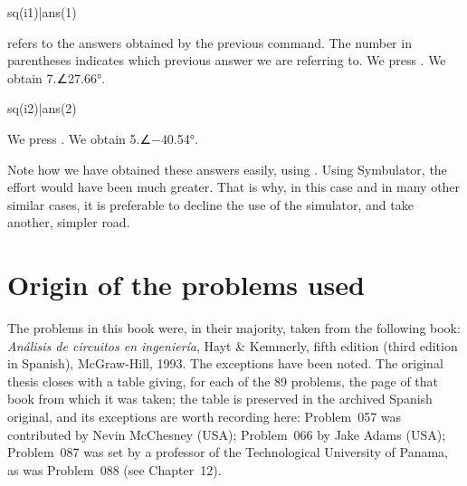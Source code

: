 \begin{entry}
sq\absang(i1)|ans(1)
\end{entry}

 refers to the answers obtained by the previous
command. The number in parentheses indicates which previous answer
we are referring to. We press . We obtain 7.∠27.66°.

\begin{entry}
sq\absang(i2)|ans(2)
\end{entry}

We press . We obtain 5.∠$-$40.54°.

Note how we have obtained these answers easily, using .
Using Symbulator, the effort would have been much greater. That is
why, in this case and in many other similar cases, it is preferable
to decline the use of the simulator, and take another, simpler road.

\chapter{Origin of the problems used}

The problems in this book were, in their majority, taken from the
following book: \emph{An\'alisis de circuitos en ingenier\'ia}, Hayt
\& Kemmerly, fifth edition (third edition in Spanish), McGraw-Hill,
1993. The exceptions have been noted. The original thesis closes
with a table giving, for each of the 89 problems, the page of that
book from which it was taken; the table is preserved in the archived
Spanish original, and its exceptions are worth recording here:
Problem~057 was contributed by Nevin McChesney (USA); Problem~066 by
Jake Adams (USA); Problem~087 was set by a professor of the
Technological University of Panama, as was Problem~088 (see
Chapter~12).
